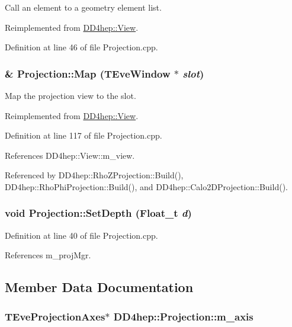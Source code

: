 Call an element to a geometry element list. 

Reimplemented from \hyperlink{class_d_d4hep_1_1_view_a413a1148e0fb6d3007c971e9f1266629}{DD4hep::View}.

Definition at line 46 of file Projection.cpp.\hypertarget{class_d_d4hep_1_1_projection_a68380e96afb21b0c4fd52e986032df80}{
\subsubsection[{Map}]{ \& Projection::Map (TEveWindow $\ast$ {\em slot})}}
\label{class_d_d4hep_1_1_projection_a68380e96afb21b0c4fd52e986032df80}


Map the projection view to the slot. 

Reimplemented from \hyperlink{class_d_d4hep_1_1_view_a570467ad2be3126bca9aa3563338bcd2}{DD4hep::View}.

Definition at line 117 of file Projection.cpp.

References DD4hep::View::m\_\-view.

Referenced by DD4hep::RhoZProjection::Build(), DD4hep::RhoPhiProjection::Build(), and DD4hep::Calo2DProjection::Build().\hypertarget{class_d_d4hep_1_1_projection_a6c7fc010be5b3df698158c82b56c9cde}{
\subsubsection[{SetDepth}]{\setlength{\rightskip}{0pt plus 5cm}void Projection::SetDepth (Float\_\-t {\em d})}}
\label{class_d_d4hep_1_1_projection_a6c7fc010be5b3df698158c82b56c9cde}


Definition at line 40 of file Projection.cpp.

References m\_\-projMgr.

\subsection{Member Data Documentation}
\hypertarget{class_d_d4hep_1_1_projection_a694863e25d4dab1fda8bf4221f099402}{
\subsubsection[{m\_\-axis}]{\setlength{\rightskip}{0pt plus 5cm}TEveProjectionAxes$\ast$ {\bf DD4hep::Projection::m\_\-axis}}}
\label{class_d_d4hep_1_1_projection_a694863e25d4dab1fda8bf4221f099402}


